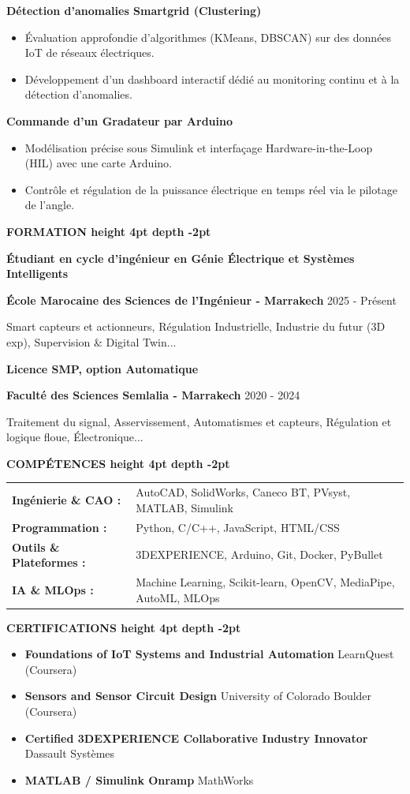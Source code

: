 \documentclass[10pt,a4paper]{altacv}
\renewcommand{\cvsection}[2][]{%
  \medskip%
  {\color{heading}\LARGE\bfseries #2 \hspace{0.2em}\leaders\vrule height 4pt depth -2pt\hfill\mbox{}}\par\smallskip
}
\renewcommand{\cvevent}[4]{%
  {\large\bfseries\color{accent}#1\par}
  \smallskip\normalsize
  \ifstrequal{#2}{}{}{%
    \textbf{\color{emphasis}#2\ifstrequal{#4}{}{}{ - #4}}%
  }%
  \hfill
  \ifstrequal{#3}{}{}{{\small#3}}%
  \par\smallskip
}
\begin{document}
{\large\bfseries\color{accent} Détection d'anomalies Smartgrid (Clustering)}\\[0.05cm]
\begin{itemize}
  \item Évaluation approfondie d'algorithmes (KMeans, DBSCAN) sur des données IoT de réseaux électriques.
  \item Développement d'un dashboard interactif dédié au monitoring continu et à la détection d'anomalies.
\end{itemize}

{\large\bfseries\color{accent} Commande d'un Gradateur par Arduino}\\[0.05cm]
\begin{itemize}
  \item Modélisation précise sous Simulink et interfaçage Hardware-in-the-Loop (HIL) avec une carte Arduino.
  \item Contrôle et régulation de la puissance électrique en temps réel via le pilotage de l'angle.
\end{itemize}


\cvsection{FORMATION}
\cvevent{Étudiant en cycle d'ingénieur en Génie Électrique et Systèmes Intelligents}{École Marocaine des Sciences de l'Ingénieur}{2025 - Présent}{Marrakech}
\small Smart capteurs et actionneurs, Régulation Industrielle, Industrie du futur (3D exp), Supervision \& Digital Twin...

\cvevent{Licence SMP, option Automatique}{Faculté des Sciences Semlalia}{2020 - 2024}{Marrakech}
\small Traitement du signal, Asservissement, Automatismes et capteurs, Régulation et logique floue, Électronique...

\cvsection{COMPÉTENCES}
\begin{tabular}{@{}ll@{}}
\textbf{Ingénierie \& CAO :} & AutoCAD, SolidWorks, Caneco BT, PVsyst, MATLAB, Simulink \\[1pt]
\textbf{Programmation :} & Python, C/C++, JavaScript, HTML/CSS \\[1pt]
\textbf{Outils \& Plateformes :} & 3DEXPERIENCE, Arduino, Git, Docker, PyBullet \\[1pt]
\textbf{IA \& MLOps :} & Machine Learning, Scikit-learn, OpenCV, MediaPipe, AutoML, MLOps \\
\end{tabular}

\cvsection{CERTIFICATIONS}
\begin{itemize}[leftmargin=*, label=\textbullet, itemsep=2pt]
  \item \textbf{Foundations of IoT Systems and Industrial Automation} \hfill {\color{emphasis}LearnQuest (Coursera)}
  \item \textbf{Sensors and Sensor Circuit Design} \hfill {\color{emphasis}University of Colorado Boulder (Coursera)}
  \item \textbf{Certified 3DEXPERIENCE Collaborative Industry Innovator} \hfill {\color{emphasis}Dassault Systèmes}
  \item \textbf{MATLAB / Simulink Onramp} \hfill {\color{emphasis}MathWorks}
\end{itemize}
\end{document}
